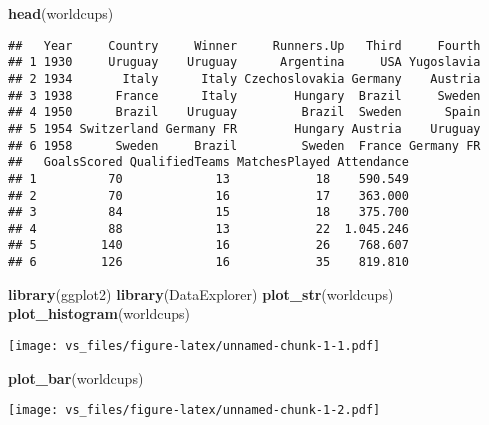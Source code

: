 \documentclass[]{article}
\newenvironment{Shaded}{\begin{snugshade}}{\end{snugshade}}
\newcommand{\KeywordTok}[1]{\textcolor[rgb]{0.13,0.29,0.53}{\textbf{#1}}}
\newcommand{\CommentTok}[1]{\textcolor[rgb]{0.56,0.35,0.01}{\textit{#1}}}
\newcommand{\NormalTok}[1]{#1}
\begin{document}
\begin{Shaded}
\begin{Highlighting}[]
\KeywordTok{head}\NormalTok{(worldcups)}
\end{Highlighting}
\end{Shaded}

\begin{verbatim}
##   Year     Country     Winner     Runners.Up   Third     Fourth
## 1 1930     Uruguay    Uruguay      Argentina     USA Yugoslavia
## 2 1934       Italy      Italy Czechoslovakia Germany    Austria
## 3 1938      France      Italy        Hungary  Brazil     Sweden
## 4 1950      Brazil    Uruguay         Brazil  Sweden      Spain
## 5 1954 Switzerland Germany FR        Hungary Austria    Uruguay
## 6 1958      Sweden     Brazil         Sweden  France Germany FR
##   GoalsScored QualifiedTeams MatchesPlayed Attendance
## 1          70             13            18    590.549
## 2          70             16            17    363.000
## 3          84             15            18    375.700
## 4          88             13            22  1.045.246
## 5         140             16            26    768.607
## 6         126             16            35    819.810
\end{verbatim}

\begin{Shaded}
\begin{Highlighting}[]
\KeywordTok{library}\NormalTok{(ggplot2)}
\KeywordTok{library}\NormalTok{(DataExplorer)}
\KeywordTok{plot_str}\NormalTok{(worldcups)}
\KeywordTok{plot_histogram}\NormalTok{(worldcups)}
\end{Highlighting}
\end{Shaded}

\texttt{[image: vs\_files/figure-latex/unnamed-chunk-1-1.pdf]}

\begin{Shaded}
\begin{Highlighting}[]
\KeywordTok{plot_bar}\NormalTok{(worldcups) }
\end{Highlighting}
\end{Shaded}

\texttt{[image: vs\_files/figure-latex/unnamed-chunk-1-2.pdf]}

\begin{Shaded}
\end{Shaded}
\end{document}
